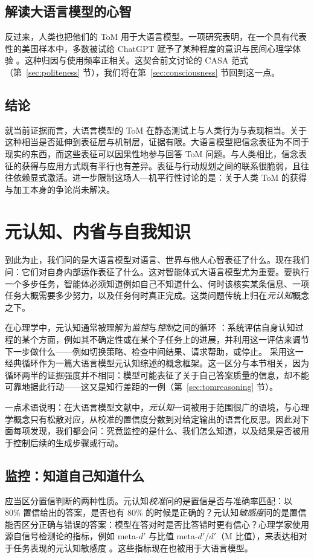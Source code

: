 \subsection{解读大语言模型的心智}
反过来，人类也把他们的 ToM 用于大语言模型。一项研究表明，在一个具有代表性的美国样本中，多数被试给 ChatGPT 赋予了某种程度的意识与民间心理学体验 \citep{colombatto2024folk}。这种归因与使用频率正相关。这契合前文讨论的 CASA 范式（第~\ref{sec:politeness} 节），我们将在第~\ref{sec:consciousness} 节回到这一点。

\subsection{结论}
就当前证据而言，大语言模型的 ToM 在静态测试上与人类行为与表现相当。关于这种相当是否延伸到表征层与机制层，证据有限。大语言模型把信念表征为不同于现实的东西，而这些表征可以因果性地参与回答 ToM 问题。与人类相比，信念表征的获得与应用方式既有平行也有差异。表征与行动规划之间的联系很脆弱，且往往依赖显式激活。进一步限制这场人—机平行性讨论的是：关于人类 ToM 的获得与加工本身的争论尚未解决。
\section{元认知、内省与自我知识} \label{sec:metacognition}
到此为止，我们问的是大语言模型对语言、世界与他人心智表征了什么。现在我们问：它们对自身内部运作表征了什么。这对智能体式大语言模型尤为重要。要执行一个多步任务，智能体必须知道例如自己不知道什么、何时该核实某条信息、一项任务大概需要多少努力，以及任务何时真正完成。这类问题传统上归在\emph{元认知}概念之下。

在心理学中，元认知通常被理解为\emph{监控}与\emph{控制}之间的循环 \citep{nelson1990meta}：系统评估自身认知过程的某个方面，例如其不确定性或在某个子任务上的进展，并利用这一评估来调节下一步做什么——例如切换策略、检查中间结果、请求帮助，或停止。\citet{liu2026metacog} 采用这一经典循环作为一篇大语言模型元认知综述的概念框架。这一区分与本节相关，因为循环两半的证据强度并不相同：模型可能表征了关于自己答案质量的信息，却不能可靠地据此行动——这又是知行差距的一例（第~\ref{sec:tomreasoning} 节）。

一点术语说明：在大语言模型文献中，\emph{元认知}一词被用于范围很广的语境，与心理学概念只有松散对应，从校准的置信度分数到对给定输出的语言化反思。因此对下面每项发现，我们都会问：究竟监控的是什么、我们怎么知道，以及结果是否被用于控制后续的生成步骤或行动。

\subsection{监控：知道自己知道什么}
应当区分置信判断的两种性质。元认知\emph{校准}问的是置信是否与准确率匹配：以 80\% 置信给出的答案，是否也有 80\% 的时候是正确的？元认知\emph{敏感度}问的是置信能否区分正确与错误的答案：模型在答对时是否比答错时更有信心？心理学家使用源自信号检测论的指标，例如 meta-$d'$ 与比值 meta-$d'/d'$（M 比值），来表达相对于任务表现的元认知敏感度 \citep{maniscalco2012signal}。这些指标现在也被用于大语言模型。

